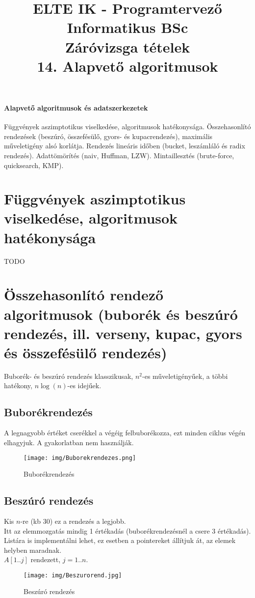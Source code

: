 \documentclass[margin=0px]{article}
\title{\textbf{{\Large ELTE IK - Programtervező Informatikus BSc} \vspace{0.2cm} \\ {\huge Záróvizsga tételek}} \vspace{0.3cm} \\ 14. Alapvető algoritmusok}
\author{}
\date{}
\newenvironment{tetel}[1]{\paragraph{#1 \\}}{}
\begin{document}
\maketitle

\begin{tetel}{Alapvető algoritmusok és adatszerkezetek}
    Függvények aszimptotikus viselkedése, algoritmusok hatékonysága. Összehasonlító rendezések (beszúró, összefésülő, gyors- és kupacrendezés), maximális műveletigény alsó korlátja. Rendezés lineáris időben (bucket, leszámláló és radix rendezés). Adattömörítés (naiv, Huffman, LZW). Mintaillesztés (brute-force, quicksearch, KMP).
\end{tetel}

\section{Függvények aszimptotikus viselkedése, algoritmusok hatékonysága}
TODO

\section{Összehasonlító rendező algoritmusok (buborék és beszúró rendezés, ill. verseny, kupac, gyors és összefésülő rendezés)}

Buborék- és beszúró rendezés klasszikusak, $n^2$-es műveletigényűek, a többi hatékony, $n\log(n)$-es idejűek.

\subsection{Buborékrendezés}

A legnagyobb értéket cserékkel a végéig felbuborékozza, ezt minden ciklus végén elhagyjuk. A gyakorlatban nem használják.
\begin{figure}[H]
    \centering
    \texttt{[image: img/Buborekrendezes.png]}
    \caption{Buborékrendezés}
\end{figure}

\subsection{Beszúró rendezés}

Kis $n$-re (kb 30) ez a rendezés a legjobb. \\
Itt az elemmozgatás mindig 1 értékadás (buborékrendezésnél a csere 3 értékadás). Listára is implementálni lehet, ez esetben a pointereket állítjuk át, az elemek helyben maradnak. \\
$A[1..j]$ rendezett, $j=1..n$.
\begin{figure}[H]
    \centering
    \texttt{[image: img/Beszurorend.jpg]}
    \caption{Beszúró rendezés}
\end{figure}
\end{document}
